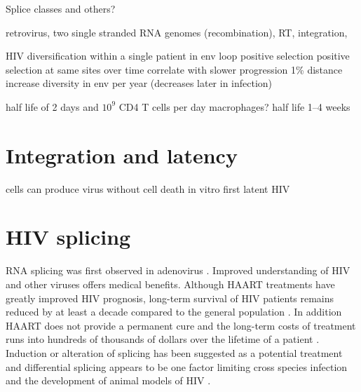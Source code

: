 \documentclass[../sherrill-Mix_thesis.tex]{subfiles}
\begin{document}
Splice classes \citep{Muesing1985} and others?

retrovirus, two single stranded RNA genomes (recombination), RT, integration,

HIV diversification within a single patient in env loop \citep{Holmes1992} positive selection \citep{Bonhoeffer1995,Ross2002} positive selection at same sites over time correlate with slower progression \citep{Wolinsky1996,Ross2002} 1\% distance increase diversity in env per year (decreases later in infection) \citep{Shankarappa1999}


half life of 2 days and $10^9$ CD4 T cells per day \citep{Ho1995,Wei1995,Perelson1997}
macrophages? half life 1--4 weeks \citep{Perelson1997} 
\citep{Finzi1997}


\section{Integration and latency}
	cells can produce virus without cell death in vitro \citep{Hoxie1985}
	first latent HIV \citep{Folks1986}

\section{HIV splicing}
	RNA splicing was first observed in adenovirus \citep{Berget1977,Chow1977}. Improved understanding of HIV and other viruses offers medical benefits. Although HAART treatments have greatly improved HIV prognosis, long-term survival of HIV patients remains reduced by at least a decade compared to the general population \citep{Lohse2007}. In addition HAART does not provide a permanent cure \citep{Richman2009} and the long-term costs of treatment runs into hundreds of thousands of dollars over the lifetime of a patient \citep{Hutchinson2006,Schackman2006}.  Induction or alteration of splicing has been suggested as a potential treatment \citep{Fukuhara2006,Mandal2010} and differential splicing appears to be one factor limiting cross species infection and the development of animal models of HIV \citep{Zheng2003}. 
\end{document}

